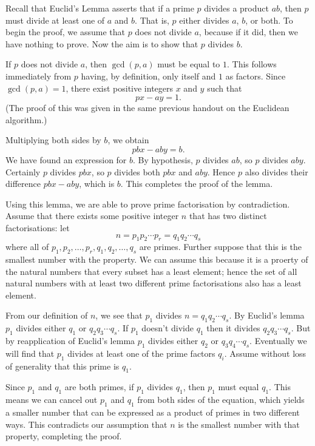 \documentclass[a4paper,10pt]{article}
\begin{document}
Recall that Euclid's Lemma asserts that if a prime \(p\) divides a product \(ab\), then \(p\) must
divide at least one of \(a\) and \(b\). That is, \(p\) either divides \(a\), \(b\), or both. To begin
the proof, we assume that \(p\) does not divide \(a\), because if it did, then we have nothing to prove.
Now the aim is to show that \(p\) divides \(b\).

If \(p\) does not divide \(a\), then \(\gcd(p,a)\) must be equal to \(1\). This follows immediately
from \(p\) having, by definition, only itself and \(1\) as factors. Since \(\gcd(p,a)=1\), there
exist positive integers \(x\) and \(y\) such that \[px-ay=1.\] (The proof of this was given in the same
previous handout on the Euclidean algorithm.)

Multiplying both sides by \(b\), we obtain \[pbx-aby=b.\] We have found an expression for \(b\). By hypothesis,
\(p\) divides \(ab\), so \(p\) divides \(aby\). Certainly \(p\) divides \(pbx\), so \(p\) divides both \(pbx\)
and \(aby\). Hence \(p\) also divides their difference \(pbx-aby\), which is \(b\). This completes the proof
of the lemma.

Using this lemma, we are able to prove prime factorisation by contradiction. Assume that there exists
some positive integer \(n\) that has two distinct factorisations: let \[n=p_1p_2\cdots p_r=q_1q_2\cdots q_s\]
where all of \(p_1,p_2,\ldots,p_r,q_1,q_2,\ldots,q_s\) are primes. Further suppose that this is the smallest
number with the property. We can assume this because it is a proerty of the natural numbers that every subset
has a least element; hence the set of all natural numbers with at least two different prime factorisations also
has a least element.

From our definition of \(n\), we see that \(p_1\) divides \(n=q_1q_2\cdots q_s\). By Euclid's lemma \(p_1\) divides
either \(q_1\) or \(q_2q_3\cdots q_s\). If \(p_1\) doesn't divide \(q_1\) then it divides \(q_2q_3\cdots q_s\). But by
reapplication of Euclid's lemma \(p_1\) divides either \(q_2\) or \(q_3q_4\cdots q_s\). Eventually we will find that
\(p_1\) divides at least one of the prime factors \(q_i\). Assume without loss of generality that this prime is \(q_1\).

Since \(p_1\) and \(q_1\) are both primes, if \(p_1\) divides \(q_1\), then \(p_1\) must equal \(q_1\). This means
we can cancel out \(p_1\) and \(q_1\) from both sides of the equation, which yields a smaller number that can
be expressed as a product of primes in two different ways. This contradicts our assumption that \(n\) is the smallest
number with that property, completing the proof.
\end{document}
